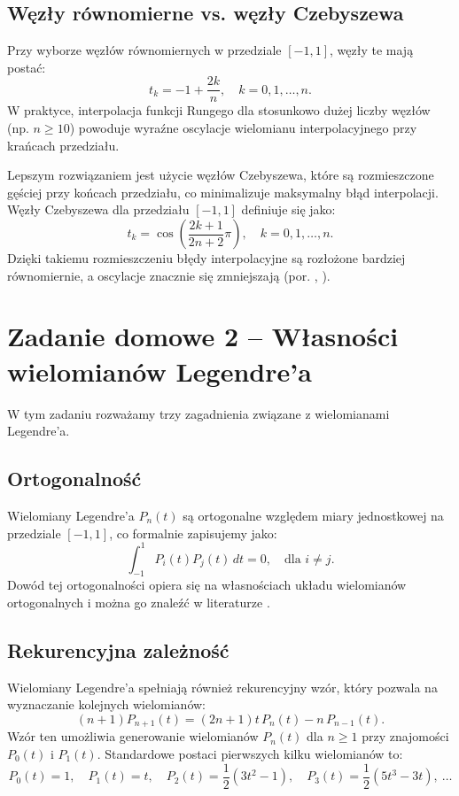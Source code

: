 \documentclass{article}
\begin{document}
\subsection{Węzły równomierne vs. węzły Czebyszewa}
Przy wyborze węzłów równomiernych w przedziale $[-1,1]$, węzły te mają postać:
\[
t_k = -1 + \frac{2k}{n}, \quad k=0,1,\dots,n.
\]
W praktyce, interpolacja funkcji Rungego dla stosunkowo dużej liczby węzłów (np. \( n \ge 10 \)) powoduje wyraźne oscylacje wielomianu interpolacyjnego przy krańcach przedziału.

Lepszym rozwiązaniem jest użycie węzłów Czebyszewa, które są rozmieszczone gęściej przy końcach przedziału, co minimalizuje maksymalny błąd interpolacji. Węzły Czebyszewa dla przedziału \([-1,1]\) definiuje się jako:
\begin{equation}
    t_k = \cos\left(\frac{2k+1}{2n+2}\pi\right), \quad k=0,1,\dots,n.
\end{equation}
Dzięki takiemu rozmieszczeniu błędy interpolacyjne są rozłożone bardziej równomiernie, a oscylacje znacznie się zmniejszają (por. \cite{wiki:Interpolacja_wielomianowa}, \cite{Higham2002}).

\newpage
\section{Zadanie domowe 2 -- Własności wielomianów Legendre’a}

W tym zadaniu rozważamy trzy zagadnienia związane z wielomianami Legendre’a.

\subsection{Ortogonalność}
Wielomiany Legendre’a \( P_n(t) \) są ortogonalne względem miary jednostkowej na przedziale \([-1,1]\), co formalnie zapisujemy jako:
\begin{equation}
    \int_{-1}^{1} P_i(t) P_j(t) \, dt = 0, \quad \text{dla } i \neq j.
\end{equation}
Dowód tej ortogonalności opiera się na własnościach układu wielomianów ortogonalnych i można go znaleźć w literaturze \cite{wiki:Legendre_polynomials}.
\subsection{Rekurencyjna zależność}
Wielomiany Legendre’a spełniają również rekurencyjny wzór, który pozwala na wyznaczanie kolejnych wielomianów:
\begin{equation}
    (n+1) P_{n+1}(t) = (2n+1)t\,P_n(t) - n\,P_{n-1}(t).
\end{equation}
Wzór ten umożliwia generowanie wielomianów \( P_n(t) \) dla \( n\geq 1 \) przy znajomości \( P_0(t) \) i \( P_1(t) \). Standardowe postaci pierwszych kilku wielomianów to:
\[
P_0(t)=1,\quad P_1(t)=t,\quad P_2(t)=\frac{1}{2}(3t^2-1),\quad P_3(t)=\frac{1}{2}(5t^3-3t),\ \ldots
\]
\end{document}
